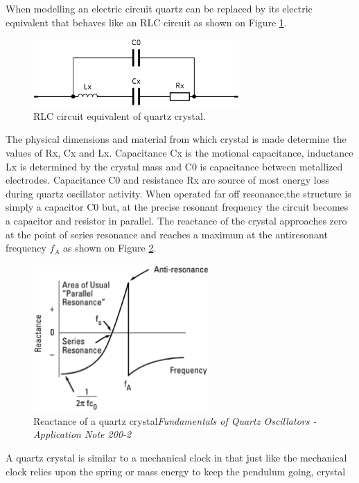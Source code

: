 When modelling an electric circuit quartz can be replaced by its electric equivalent that 
behaves like an RLC circuit as shown on Figure \ref{fig:quartz_equiv}.
\begin{figure}[htb] 
	\label{fig:quartz_equiv}
	\centering
	\includegraphics[width=0.7\textwidth]{figures/quartz_equiv}
	\caption{RLC circuit equivalent of quartz crystal.}
\end{figure}
The physical dimensions and material from which crystal is made determine the values
of Rx, Cx and Lx. 
Capacitance Cx is the motional capacitance, inductance Lx is determined by the crystal mass
and C0 is capacitance between metallized electrodes.
Capacitance C0 and resistance  Rx are source of most energy loss during quartz oscillator activity.
When operated far off resonance,the structure is simply a capacitor C0 but,
at the precise resonant frequency the circuit becomes a capacitor and resistor in parallel.
The reactance of the crystal approaches zero at the point of series resonance and reaches 
a maximum at the antiresonant frequency $f_{A}$ as shown on Figure \ref{fig:quartz_reactance}.
\begin{figure}[htb] 
	\label{fig:quartz_reactance}
	\centering
	\includegraphics[width=0.6\textwidth]{figures/quartz_reactance}
	\caption{Reactance of a quartz crystal\textit{Fundamentals  of 
	Quartz  Oscillators - Application  Note  200-2}}
\end{figure}
A quartz crystal is similar to a mechanical clock in that just like the 
mechanical clock relies upon the spring or mass  energy to keep the pendulum going, crystal 
